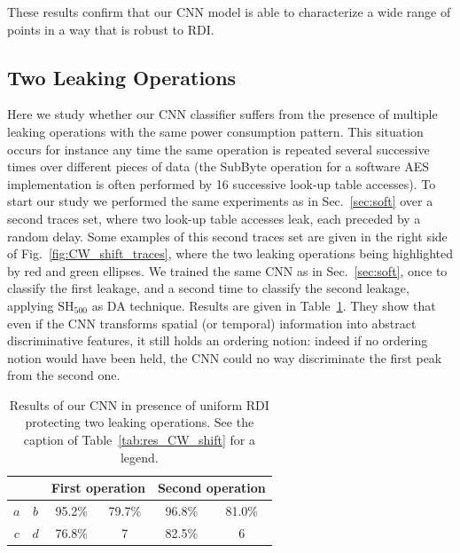 These results confirm that our CNN model is able to characterize a wide range of points in a way that is robust to RDI. 

\subsection{Two Leaking Operations}
Here we study whether our CNN classifier suffers from the presence of multiple leaking operations with the same power consumption pattern. This situation occurs for instance any time the same operation is repeated several successive times over different pieces of data (\eg the SubByte operation for a software AES implementation is often performed by 16 successive look-up table accesses). To start our study we performed the same experiments as in Sec.~\ref{sec:soft} over a second traces set, where two look-up table accesses leak, each preceded by a random delay. Some examples of this second traces set are given in the right side of Fig.~\ref{fig:CW_shift_traces}, where the two leaking operations being highlighted by red and green ellipses. We trained the same CNN as in Sec.~\ref{sec:soft}, once to classify the first leakage, and a second time to classify the second leakage, applying $\mathrm{SH}_{500}$ as DA technique. Results are given in Table~\ref{tab:label}. They show that even if the CNN transforms spatial (or temporal) information into abstract discriminative features, it still holds an ordering notion: indeed if no ordering notion would have been held, the CNN could no way discriminate the first peak from the second one. 


\begin{table}[]
\centering
\caption{Results of our CNN in presence of uniform RDI protecting two leaking operations. See the caption of Table~\ref{tab:res_CW_shift} for a legend.}
\label{tab:label}
\begin{tabular}{|c|c|c|c|c|c|}
\hline
\multicolumn{2}{|c|}{} & \multicolumn{2}{c|}{First operation} & \multicolumn{2}{c|}{Second operation} \\ \hline
$a$        & $b$       & 95.2\%            & 79.7\%           & 96.8\%            & 81.0\%            \\ \hline
$c$        & $d$       & 76.8\%            & 7                & 82.5\%            & 6                 \\ \hline
\end{tabular}
\end{table}




